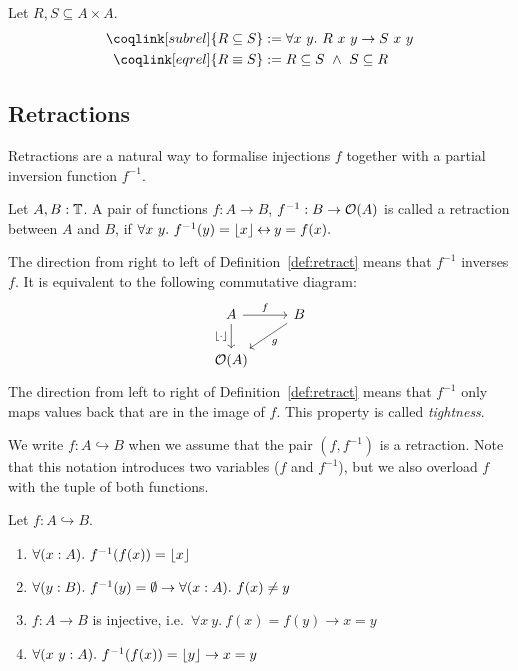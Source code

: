 \begin{definition}
  Let $R,S \subseteq A \times A$.
  \begin{align*}
    \coqlink[subrel]{R \subseteq S} &:= \forall x~y.~R~x~y \rightarrow S~x~y \\
    \coqlink[eqrel] {R \equiv S}    &:= R \subseteq S ~\land~ S \subseteq R
  \end{align*}
\end{definition}


\subsection{Retractions}
\label{sec:retracts}

Retractions are a natural way to formalise injections $f$ together with a partial inversion function $f^{-1}$.

\begin{definition}[Retraction]
  \label{def:retract}
  Let $A, B : \mathbb{T}$.  A pair of functions $f : A \to B$, $f^{-1} : B \rightarrow \mathcal{O}(A)$ is called a retraction between $A$ and $B$, if
  $ \forall x~y.~f^{-1}(y) = \left\lfloor {x} \right\rfloor \mathbin{\leftrightarrow} y = f(x). $
\end{definition}

The direction from right to left of Definition~\ref{def:retract} means that $f^{-1}$ inverses $f$.  It is equivalent to the following commutative
diagram:
\[
  \begin{tikzcd}
    A \arrow[r, "f"] \arrow[d, "\Some \cdot", swap] & B \arrow[ld, "g"] \\
    \Option(A) &
  \end{tikzcd}
\]
The direction from left to right of Definition~\ref{def:retract} means that $f^{-1}$ only maps values back that are in the image of $f$.  This
property is called \textit{tightness}.

We write $f : A \hookrightarrow B$ when we assume that the pair $(f, f^{-1})$ is a retraction.  Note that this notation introduces two variables ($f$
and $f^{-1}$), but we also overload $f$ with the tuple of both functions.


\begin{lemma}
  \label{lem:retracts-basic}
  Let $f : A \hookrightarrow B$.
  \begin{enumerate}
  \item \label{lem:retract_g_adjoint}
    $\forall (x:A).~f^{-1}(f(x)) = \left\lfloor {x} \right\rfloor$
  \item \label{lem:retract_g_None}
    $\forall (y:B).~f^{-1}(y) = \emptyset \rightarrow \forall (x:A).~f(x) \neq y$
  \item \label{lem:retract_f_injective}
    $f : A \to B$ is injective, i.e.\ $\forall x~y.~f(x)=f(y) \rightarrow x=y$
  \item \label{lem:retract_g_Some}
    $\forall (x~y:A).~f^{-1}(f(x)) = \left\lfloor {y} \right\rfloor \rightarrow x=y$
  \end{enumerate}
\end{lemma}

